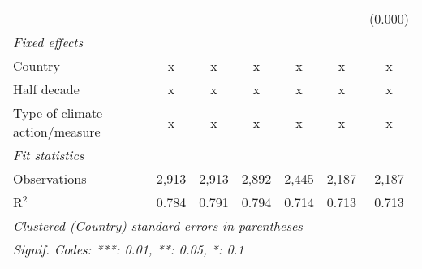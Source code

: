 \begin{tabular}{lcccccc}
                                                             &               &               &               &              &             & (0.000)\\   
   \emph{Fixed effects}\\
   Country                                                   & x             & x             & x             & x            & x           & x\\  
   Half decade                                               & x             & x             & x             & x            & x           & x\\  
   Type of climate action/measure                            & x             & x             & x             & x            & x           & x\\  
   \midrule \emph{Fit statistics}\\
   Observations                                              & 2,913         & 2,913         & 2,892         & 2,445        & 2,187       & 2,187\\  
   R$^2$                                                     & 0.784         & 0.791         & 0.794         & 0.714        & 0.713       & 0.713\\  
   \midrule
   \multicolumn{7}{l}{\emph{Clustered (Country) standard-errors in parentheses}}\\
   \multicolumn{7}{l}{\emph{Signif. Codes: ***: 0.01, **: 0.05, *: 0.1}}\\
\end{tabular}
\par\endgroup


